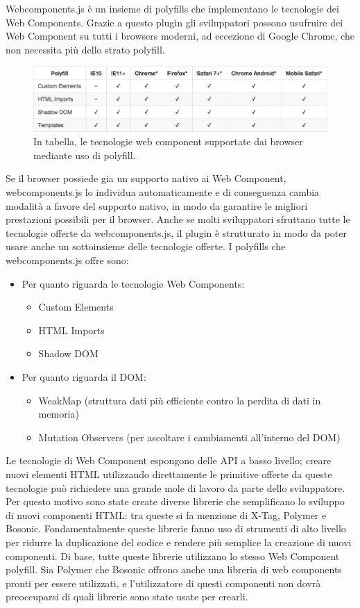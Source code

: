 Webcomponents.js è un insieme di polyfills che implementano le tecnologie dei Web Components. Grazie a questo plugin gli sviluppatori possono usufruire dei Web Component su tutti i browsers moderni, ad eccezione di Google Chrome, che non necessita più dello strato polyfill.
\\
\begin{figure}[htb]
 \centering
 \includegraphics[width=1\linewidth]{images/chapter_tecnologie_abilitanti/tecnologie_abilitanti_polyfill.png}\hfill
 \caption[Supporto ai polyfill]{In tabella, le tecnologie web component supportate dai browser mediante uso di polyfill.}
 \label{fig:tecnologie_abilitanti_polyfill}
\end{figure}
Se il browser possiede gia un supporto nativo ai Web Component, webcomponents.js lo individua automaticamente e di conseguenza cambia modalità a favore del supporto nativo, in modo da garantire le migliori prestazioni possibili per il browser. 
Anche se molti sviluppatori sfruttano tutte le tecnologie offerte da webcomponents.js, il plugin è strutturato in modo da poter usare anche un sottoinsieme delle tecnologie offerte. 
I polyfills che webcomponents.js offre sono:
\begin{itemize}
\item Per quanto riguarda le tecnologie Web Components:
\begin{itemize} 
\item Custom Elements
\item HTML Imports
\item Shadow DOM
\end{itemize}
\item Per quanto riguarda il DOM:
\begin{itemize}
\item WeakMap (struttura dati più efficiente contro la perdita di dati in memoria)
\item Mutation Observers (per ascoltare i cambiamenti all’interno del DOM)
\end{itemize}
\end{itemize}
Le tecnologie di Web Component espongono delle API a basso livello; creare nuovi elementi HTML utilizzando direttamente le primitive offerte da queste tecnologie può richiedere una grande mole di lavoro da parte dello sviluppatore. Per questo motivo sono state create diverse librerie che semplificano lo sviluppo di nuovi componenti HTML: tra queste si fa menzione di X-Tag, Polymer e Bosonic. Fondamentalmente queste librerie fanno uso di strumenti di alto livello per ridurre la duplicazione del codice e rendere più semplice la creazione di nuovi componenti. Di base, tutte queste librerie utilizzano lo stesso Web Component polyfill. Sia Polymer che Bosonic offrono anche una libreria di web components pronti per essere utilizzati, e l’utilizzatore di questi componenti non dovrà preoccuparsi di quali librerie sono state usate per crearli. 
